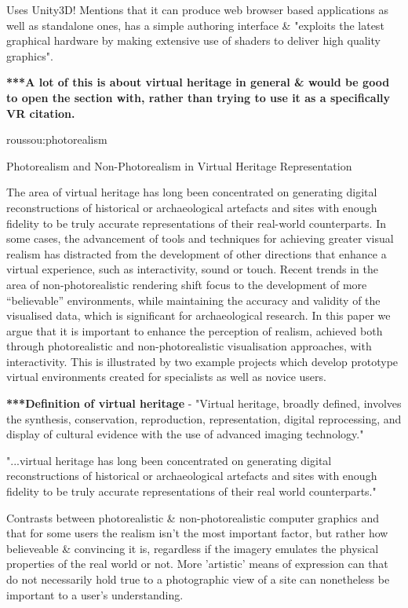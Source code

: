 Uses Unity3D! Mentions that it can produce web browser based applications as well as standalone
ones, has a simple authoring interface \& "exploits the latest graphical hardware by making extensive
use of shaders to deliver high quality graphics".


\textbf{***A lot of this is about virtual heritage in general \& would be good to open the section with, rather than trying to use it as a specifically VR citation.}

roussou:photorealism

Photorealism and Non-Photorealism
in Virtual Heritage Representation

The area of virtual heritage has long been concentrated on generating digital reconstructions of historical or
archaeological artefacts and sites with enough fidelity to be truly accurate representations of their real-world
counterparts. In some cases, the advancement of tools and techniques for achieving greater visual realism has
distracted from the development of other directions that enhance a virtual experience, such as interactivity, sound
or touch. Recent trends in the area of non-photorealistic rendering shift focus to the development of more “believable”
environments, while maintaining the accuracy and validity of the visualised data, which is significant for
archaeological research. In this paper we argue that it is important to enhance the perception of realism, achieved
both through photorealistic and non-photorealistic visualisation approaches, with interactivity. This is illustrated
by two example projects which develop prototype virtual environments created for specialists as well as novice
users.

\textbf{***Definition of virtual heritage} - "Virtual heritage, broadly defined, involves the synthesis, conservation,
reproduction, representation, digital reprocessing, and display of cultural evidence with the use of
advanced imaging technology."
        
"...virtual heritage has long been concentrated on generating digital reconstructions of historical or
archaeological artefacts and sites with enough fidelity to be truly accurate representations of their real
world counterparts."
        
Contrasts between photorealistic \& non-photorealistic computer graphics and that for some users the realism
isn't the most important factor, but rather how believeable \& convincing it is, regardless if the imagery
emulates the physical properties of the real world or not. More 'artistic' means of expression can that do
not necessarily hold true to a photographic view of a site can nonetheless be important to a user's understanding.
        
